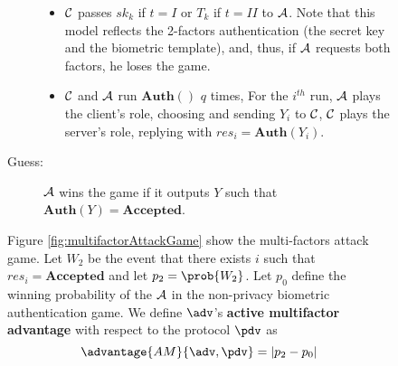 \begin{description}
\begin{description}
\begin{description}
\begin{itemize}
      \item $\mathcal{C}$ passes $sk_k$ if $t = I$ or $T_k$ if $t = II$ to
        $\mathcal{A}$. Note that this model reflects the 2-factors authentication
        (the secret key and the biometric template), and, thus, if $\mathcal{A}$
        requests both factors, he loses the game.
      \item $\mathcal{C}$ and $\mathcal{A}$ run $\mathbf{Auth()}$ $q$ times, For
        the $i^{th}$ run, $\mathcal{A}$ plays the client's role, choosing and
        sending $Y_i$ to $\mathcal{C}$, $\mathcal{C}$ plays the server's role,
        replying with $res_i = \mathbf{Auth}(Y_i)$.
      \end{itemize}
    \item[Guess:] $\mathcal{A}$ wins the game if it outputs $Y$ such that
      $\mathbf{Auth}(Y) = \textbf{Accepted}$.
    \end{description}
    
    Figure \ref{fig:multifactorAttackGame} show the multi-factors attack
    game. Let $W_{2}$ be the event that there exists $i$ such that
    $res_{i} = \mathbf{Accepted}$ and let $p_{2} = \prob{W_{2}} $. Let $p_{0}$
    define the winning probability of the $\mathcal{A}$ in the non-privacy
    biometric authentication game. We define $\adv$'s \textbf{active multifactor
      advantage} with respect to the protocol $\pdv$ as
    \[
      \advantage{AM}{\adv,\pdv} = |p_{2} - p_{0}|
    \]
    

\end{description}
\end{description}
